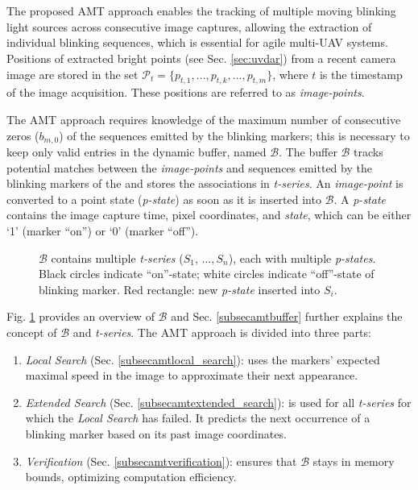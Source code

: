 \documentclass[lettersize,preprint]{elsarticle}
\newcommand{\B}{$\mathcal{B}$}
\newcommand{\ps}{\emph{p-state}}
\newcommand{\ts}{\emph{t-series}}
\begin{document}
\section{}\label{sec:ami}

The proposed \gls{AMT} approach enables the tracking of multiple moving blinking light sources across consecutive image captures, allowing the extraction of individual blinking sequences, which is essential for agile multi-\gls{UAV} systems.
Positions of extracted bright points (see Sec. \ref{sec:uvdar}) from a recent camera image are stored in the set $\mathcal{P}_t = \{p_{t,1},\hdots, p_{t,k}, \hdots,p_{t,m}\}$, where $t$ is the timestamp of the image acquisition.
These positions are referred to as \emph{image-points}.

The \gls{AMT} approach requires knowledge of the maximum number of consecutive zeros ($b_{m,0}$) of the sequences emitted by the blinking markers; this is necessary to keep only valid entries in the dynamic buffer, named \B{}.
The buffer \B{} tracks potential matches between the \emph{image-points} and sequences emitted by the blinking markers of the  and stores the associations in \ts{}.
An \emph{image-point} is converted to a point state (\emph{p-state}) as soon as it is inserted into \B{}. 
A \ps{} contains the image capture time, pixel coordinates, and \emph{state}, which can be either `1' (marker \enquote{on}) or `0' (marker \enquote{off}).
\begin{figure}
  \centering
  \vspace{-8pt}
  \scalebox{0.5}{}
    \caption{\B{} contains multiple \ts{} ($S_1$, $\hdots,S_{n}$), each with multiple \emph{p-states}. Black circles indicate \enquote{on}-state; white circles indicate \enquote{off}-state of blinking marker. Red rectangle: new \ps{} inserted into $S_i$.}
  \label{figamtbuffer}
\end{figure}
Fig. \ref{figamtbuffer} provides an overview of \B{} and Sec. \ref{subsecamtbuffer} further explains the concept of \B{} and \ts{}.
The \gls{AMT} approach is divided into three parts:
\begin{enumerate}
  \item \emph{Local Search} (Sec. \ref{subsecamtlocal_search}): uses the markers' expected maximal speed in the image to approximate their next appearance.
  \item \emph{Extended Search} (Sec. \ref{subsecamtextended_search}): is used for all \ts{} for which the \emph{Local Search} has failed. 
  It predicts the next occurrence of a blinking marker based on its past image coordinates.
  \item \emph{Verification} (Sec. \ref{subsecamtverification}): ensures that \B{} stays in memory bounds, optimizing computation efficiency.
\end{enumerate}
\end{document}
